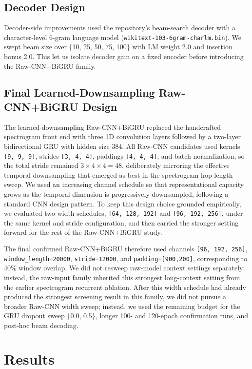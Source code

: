 \subsection{Decoder Design}

Decoder-side improvements used the repository's beam-search decoder with a character-level 6-gram language model (\texttt{wikitext-103-6gram-charlm.bin}). We swept beam size over \{10, 25, 50, 75, 100\} with LM weight 2.0 and insertion bonus 2.0. This let us isolate decoder gain on a fixed encoder before introducing the Raw-CNN+BiGRU family.

\subsection{Final Learned-Downsampling Raw-CNN+BiGRU Design}

The learned-downsampling Raw-CNN+BiGRU replaced the handcrafted spectrogram front end with three 1D convolution layers followed by a two-layer bidirectional GRU with hidden size 384. All Raw-CNN candidates used kernels \texttt{[9, 9, 9]}, strides \texttt{[3, 4, 4]}, paddings \texttt{[4, 4, 4]}, and batch normalization, so the total stride remained $3 \times 4 \times 4 = 48$, deliberately mirroring the effective temporal downsampling that emerged as best in the spectrogram hop-length sweep. We used an increasing channel schedule so that representational capacity grows as the temporal dimension is progressively downsampled, following a standard CNN design pattern. To keep this design choice grounded empirically, we evaluated two width schedules, \texttt{[64, 128, 192]} and \texttt{[96, 192, 256]}, under the same kernel and stride configuration, and then carried the stronger setting forward for the rest of the Raw-CNN+BiGRU study.

The final confirmed Raw-CNN+BiGRU therefore used channels \texttt{[96, 192, 256]}, \texttt{window\_length=20000}, \texttt{stride=12000}, and \texttt{padding=[900,200]}, corresponding to 40\% window overlap. We did not resweep raw-model context settings separately; instead, the raw-input family inherited this strongest long-context setting from the earlier spectrogram recurrent ablation. After this width schedule had already produced the strongest screening result in this family, we did not pursue a broader Raw-CNN width sweep; instead, we used the remaining budget for the GRU dropout sweep \{0.0, 0.5\}, longer 100- and 120-epoch confirmation runs, and post-hoc beam decoding.

\section{Results}

